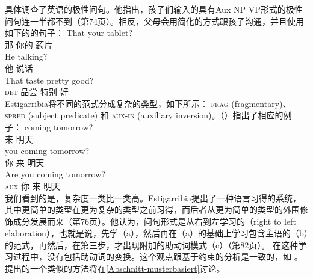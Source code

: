  \citet{Estigarribia2009a}具体调查了英语的极性问句。他指出，孩子们输入的具有Aux NP VP形式的极性问句连一半都不到（第74页）。相反，父母会用简化的方式跟孩子沟通，并且使用如下的的句子：
\eal
\ex 
\gll That your tablet?\\
那 你的 药片\\
\ex 
\gll He talking?\\
他 说话\\
\ex 
\gll That taste pretty good?\\
\textsc{det} 品尝 特别 好\\
\zl
Estigarribia将不同的范式分成复杂的类型，如下所示：
\textsc{frag}
(fragmentary)、\textsc{spred} (subject predicate) 和 \textsc{aux-in} (auxiliary
  inversion)。（）指出了相应的例子：
\eal\settowidth{}
\ex 
\gll coming tomorrow?         \\
来 明天\\
\ex 
\gll you coming tomorrow?     \\
你 来 明天\\
\ex 
\gll Are you coming tomorrow? \\
\textsc{aux} 你 来 明天\\
\zl
我们看到的是，复杂度一类比一类高。Estigarribia提出了一种语言习得的系统，其中更简单的类型在更为复杂的类型之前习得，而后者从更为简单的类型的外围修饰成分发展而来（第76页）。他认为，问句形式是从右到左学习的（right to left elaboration），也就是说，先学（a），然后再在（a）的基础上学习包含主语的（b）的范式，再然后，在第三步，才出现附加的助动词模式（c）（第82页）。
在这种学习过程中，没有包括助动词的变换。这个观点跟基于约束的分析是一致的，如 \citet{GSag2000a-u}。 \citet*{FPAG2007a}提出的一个类似的方法将在\ref{Abschnitt-musterbasiert}讨论。
